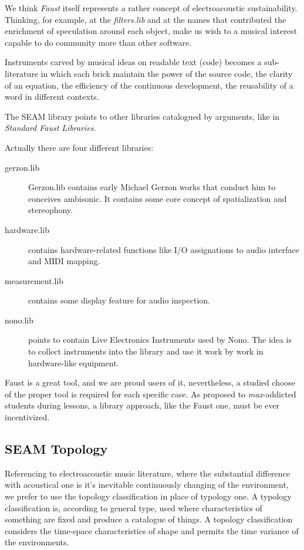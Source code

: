 \documentclass[twoside,a4paper]{article}
\begin{document}
We think \emph{Faust} itself represents a rather concept of electroacoustic sustainability. Thinking, for example, at the \emph{filters.lib} and at the names that contributed the enrichment of speculation around each object, make us wish to a musical interest capable to do community more than other software.

Instruments carved by musical ideas on readable text (code) becomes a sub-literature in which each brick maintain the power of the source code, the clarity of an equation, the efficiency of the continuous development, the reusability of a word in different contexts. 

The SEAM library points to other libraries catalogued by arguments, like in \emph{Standard Faust Libraries}. 

Actually there are four different libraries:
\begin{description}
\item[gerzon.lib] Gerzon.lib contains early Michael Gerzon works that conduct him to conceives ambisonic. It contains some core concept of spatialization and stereophony. 
\item[hardware.lib] contains hardware-related functions like I/O assignations to audio interface and MIDI mapping.
\item[measurement.lib] contains some display feature for audio inspection.
\item[nono.lib] points to contain Live Electronics Instruments used by Nono. The idea is to collect instruments into the library and use it work by work in hardware-like equipment. 
\end{description}

Faust is a great tool, and we are proud users of it, nevertheless, a studied choose of the proper tool is required for each specific case. As proposed to \emph{max}-addicted students during lessons, a library approach, like the Faust one, must be ever incentivized.

\subsection{SEAM Topology}

Referencing to electroacoustic music literature, where the substantial difference with acoustical one is it's inevitable continuously changing of the environment, we prefer to use the topology classification in place of typology one. A typology classification is, according to general type, used where characteristics of something are fixed and produce a catalogue of things. A topology classification considers the time-space characteristics of shape and permits the time variance of the environments.
\end{document}
